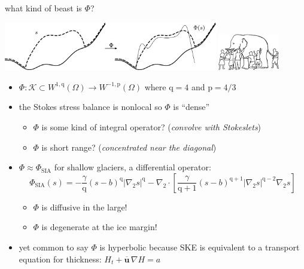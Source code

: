 \documentclass[usepdftitle=false,usenames,dvipsnames]{beamer}
\newcommand{\grad}{\nabla}
\newcommand{\bu}{\mathbf{u}}
\newcommand{\pp}{{\text{p}}}
\newcommand{\qq}{{\text{q}}}
\begin{document}
\begin{frame}{what kind of beast is $\Phi$?}

\begin{center}
\includegraphics[width=0.7\textwidth]{figs/idoaction.png} \hfill \includegraphics[width=0.2\textwidth]{figs/elephant.png}
\end{center}

\begin{itemize}
\small
\item $\Phi : \mathcal{K} \subset W^{1,\qq}(\Omega) \to W^{-1,\pp}(\Omega)$ where $\qq=4$ and $\pp=4/3$
\item the Stokes stress balance is nonlocal so $\Phi$ is ``dense''
    \begin{itemize}
    \item $\Phi$ is some kind of integral operator? (\emph{convolve with Stokeslets})
    \item $\Phi$ is short range? (\emph{concentrated near the diagonal})
    \end{itemize}
\item $\Phi \approx \Phi_{\text{SIA}}$ for shallow glaciers, a differential operator:
    $$\Phi_{\text{SIA}}(s) = - \frac{\gamma}{\qq} (s-b)^{\qq} |\grad_2 s|^{\qq} - \grad_2 \cdot\left[\frac{\gamma}{\qq+1} (s-b)^{\qq+1} |\grad_2 s|^{\qq-2} \grad_2 s\right]$$

    \begin{itemize}
    \item $\Phi$ is diffusive in the large!
    \item $\Phi$ is degenerate at the ice margin!
    \end{itemize}
\item yet common to say $\Phi$ is hyperbolic because SKE is equivalent to a transport equation for thickness: $H_t + \overline{\bu}\, \grad H = a$
\end{itemize}
\end{frame}
\end{document}
